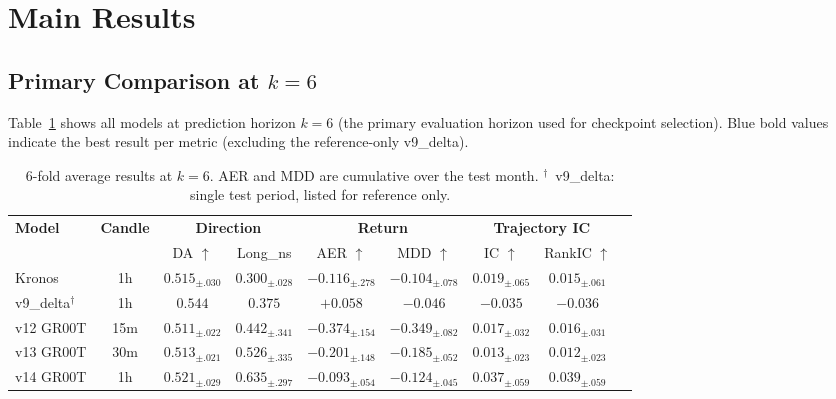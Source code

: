 \documentclass[11pt,a4paper]{article}
\newcommand{\best}[1]{\textcolor{bestblue}{\textbf{#1}}}
\newcommand{\refmark}{$^\dagger$}
\begin{document}
\section{Main Results}

\subsection{Primary Comparison at \texorpdfstring{$k = 6$}{k=6}}

Table~\ref{tab:main} shows all models at prediction horizon $k=6$ (the primary evaluation horizon used for checkpoint selection).
Blue bold values indicate the best result per metric (excluding the reference-only v9\_delta).

\begin{table}[h]
\centering
\caption{6-fold average results at $k=6$. AER and MDD are cumulative over the test month.
\refmark~v9\_delta: single test period, listed for reference only.}
\label{tab:main}
\setlength{\tabcolsep}{5pt}
\renewcommand{\arraystretch}{1.25}
\begin{tabular}{lc ccc cc cc}
\toprule
\multirow{2}{*}{\textbf{Model}} & \multirow{2}{*}{\textbf{Candle}} &
  \multicolumn{2}{c}{\textbf{Direction}} &
  \multicolumn{2}{c}{\textbf{Return}} &
  \multicolumn{2}{c}{\textbf{Trajectory IC}} \\
\cmidrule(lr){3-4}\cmidrule(lr){5-6}\cmidrule(lr){7-8}
 & & DA $\uparrow$ & Long\_ns & AER $\uparrow$ & MDD $\uparrow$ & IC $\uparrow$ & RankIC $\uparrow$ \\
\midrule
\rowcolor{lightgray}
Kronos        & 1h  & $0.515_{\pm.030}$ & $0.300_{\pm.028}$ & $-0.116_{\pm.278}$ & $-0.104_{\pm.078}$ & $0.019_{\pm.065}$ & $0.015_{\pm.061}$ \\
v9\_delta\refmark & 1h & $0.544$           & $0.375$           & $+0.058$           & $-0.046$           & $-0.035$          & $-0.036$ \\
v12 GR00T     & 15m & $0.511_{\pm.022}$ & $0.442_{\pm.341}$ & $-0.374_{\pm.154}$ & $-0.349_{\pm.082}$ & $0.017_{\pm.032}$ & $0.016_{\pm.031}$ \\
v13 GR00T     & 30m & $0.513_{\pm.021}$ & $0.526_{\pm.335}$ & $-0.201_{\pm.148}$ & $-0.185_{\pm.052}$ & $0.013_{\pm.023}$ & $0.012_{\pm.023}$ \\
v14 GR00T     & 1h  & \best{$0.521_{\pm.029}$} & \best{$0.635_{\pm.297}$} & \best{$-0.093_{\pm.054}$} & $-0.124_{\pm.045}$ & \best{$0.037_{\pm.059}$} & \best{$0.039_{\pm.059}$} \\
\bottomrule
\end{tabular}
\end{table}
\end{document}

